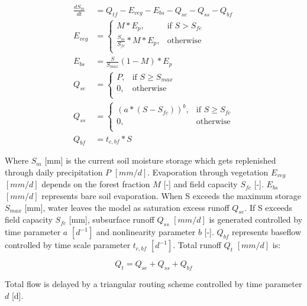 \begin{align}
	\frac{dS_m}{dt} &= Q_{tf} - E_{veg} - E_{bs}  - Q_{se} - Q_{ss} - Q_{bf}\\
	E_{veg} &= \begin{cases}
		M*E_p, &\text{if } S > S_{fc} \\
		\frac{S_m}{S_{fc}}*M*E_p, &\text{otherwise} \\
	\end{cases} \\
	E_{bs} &= \frac{S}{S_{max}}(1-M)*E_p \\
	Q_{se} &= \begin{cases}
		P, &\text{if } S \geq S_{max}\\
		0, &\text{otherwise}\\
	\end{cases}\\
	Q_{ss} &= \begin{cases}
		\left(a*(S-S_{fc})\right)^b, &\text{if } S \geq S_{fc} \\
		0, &\text{otherwise}\\
		\end{cases}\\
	Q_{bf} &= t_{c,bf}*S	
\end{align}

Where $S_m$ [mm] is the current soil moisture storage which gets replenished through daily precipitation $P$ $[mm/d]$. Evaporation through vegetation $E_{veg}$ $[mm/d]$ depends on the forest fraction $M$ [-] and field capacity $S_{fc}$ [-]. $E_{bs}$ $[mm/d]$ represents bare soil evaporation. When S exceeds the maximum storage $S_{max}$ [mm], water leaves the model as saturation excess runoff $Q_{se}$. If S exceeds field capacity $S_{fc}$ [mm], subsurface runoff $Q_{ss}$ $[mm/d]$ is generated controlled by time parameter $a$ $[d^{-1}]$ and nonlinearity parameter $b$ [-]. $Q_{bf}$ represents baseflow controlled by time scale parameter $t_{c,bf}$ $[d^{-1}]$. Total runoff $Q_t$ $[mm/d]$ is:

\begin{equation}
	Q_t = Q_{se} + Q_{ss} + Q_{bf}
\end{equation}

Total flow is delayed by a triangular routing scheme controlled by time parameter $d$ [d].

